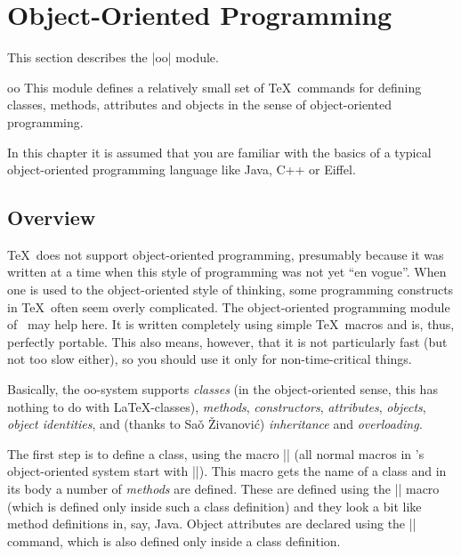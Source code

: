 %
%
%


\section{Object-Oriented Programming}
\label{section-oop}

This section describes the |oo| module.

\begin{pgfmodule}{oo}
    This module defines a relatively small set of \TeX\ commands for defining
    classes, methods, attributes and objects in the sense of object-oriented
    programming.
\end{pgfmodule}

In this chapter it is assumed that you are familiar with the basics of a
typical object-oriented programming language like Java, C++ or Eiffel.


\subsection{Overview}

\TeX\ does not support object-oriented programming, presumably because it was
written at a time when this style of programming was not yet ``en vogue''. When
one is used to the object-oriented style of thinking, some programming
constructs in \TeX\ often seem overly complicated. The object-oriented
programming module of \pgfname\ may help here. It is written completely using
simple \TeX\ macros and is, thus, perfectly portable. This also means, however,
that it is not particularly fast (but not too slow either), so you should use
it only for non-time-critical things.

Basically, the oo-system supports \emph{classes} (in the object-oriented sense,
this has nothing to do with \LaTeX-classes), \emph{methods},
\emph{constructors}, \emph{attributes}, \emph{objects}, \emph{object
identities}, and (thanks to Saǒ Živanović) \emph{inheritance} and
\emph{overloading.}

The first step is to define a class, using the macro |\pgfooclass| (all normal
macros in \pgfname's object-oriented system start with |\pgfoo|). This macro
gets the name of a class and in its body a number of \emph{methods} are
defined. These are defined using the |\method| macro (which is defined only
inside such a class definition) and they look a bit like method definitions in,
say, Java. Object attributes are declared using the |\attribute| command, which
is also defined only inside a class definition.

